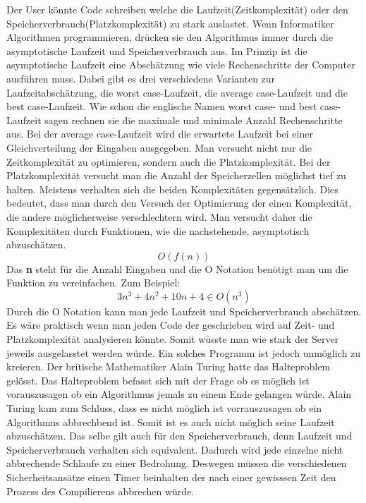 \documentclass[10pt]{article}
\begin{document}
		Der User könnte Code schreiben welche die Laufzeit(Zeitkomplexität) oder den Speicherverbrauch(Platzkomplexität) zu stark auslastet. Wenn Informatiker Algorithmen programmieren, drücken sie den Algorithmus immer durch die  asymptotische Laufzeit und Speicherverbrauch  aus. Im Prinzip ist die asymptotische Laufzeit eine Abschätzung wie viele Rechenschritte der Computer ausführen muss. Dabei gibt es drei verschiedene Varianten zur Laufzeitabschätzung, die worst case-Laufzeit, die average case-Laufzeit und die best case-Laufzeit. Wie schon die englische Namen worst case- und best case-Laufzeit sagen rechnen sie die maximale und minimale Anzahl Rechenschritte aus. Bei der average case-Laufzeit wird die erwartete Laufzeit bei einer Gleichverteilung der Eingaben ausgegeben.\cite{laufzeit}  Man versucht nicht nur die Zeitkomplexität zu optimieren, sondern auch die Platzkomplexität. Bei der Platzkomplexität versucht man die Anzahl der Speicherzellen möglichst tief zu halten. Meistens verhalten sich die beiden Komplexitäten gegensätzlich. Dies bedeutet, dass man durch den Versuch der Optimierung der einen Komplexität, die andere möglicherweise verschlechtern wird.\cite{platzkomplexität} Man versucht daher die  Komplexitäten durch Funktionen, wie die nachstehende, asymptotisch abzuschätzen.	$$ O(f(n)) $$
		Das \textbf{n} steht für die Anzahl Eingaben und die O Notation benötigt man um die Funktion zu vereinfachen.\cite{Onotation} Zum Beispiel:
		$$ 3n^{3}+4n^{2}+10n+4 \in O(n^{3})$$
		Durch die O Notation kann man jede Laufzeit und Speicherverbrauch abschätzen. Es wäre praktisch wenn man jeden Code der geschrieben wird  auf Zeit- und Platzkomplexität analysieren könnte. Somit wüsste man wie stark der Server jeweils ausgelasstet werden würde. Ein solches Programm ist jedoch unmöglich zu kreieren. Der britische Mathematiker Alain Turing hatte das Halteproblem gelösst. Das Halteproblem befasst sich mit der Frage ob es möglich ist vorauszusagen ob ein Algorithmus jemals zu einem Ende gelangen würde. Alain Turing kam zum Schluss, dass es nicht möglich ist vorrauszusagen ob ein Algorithmus abbrechbend ist.\cite{halteproblem} Somit ist es auch nicht möglich seine Laufzeit abzuschätzen. Das selbe gilt auch für den Speicherverbrauch, denn Laufzeit und Speicherverbrauch verhalten sich equivalent. Dadurch wird jede einzelne nicht abbrechende Schlaufe zu einer Bedrohung. Deswegen müssen die verschiedenen Sicherheitsansätze einen Timer beinhalten der nach einer gewisssen Zeit den Prozess des Compilierens abbrechen würde.
		
\end{document}
